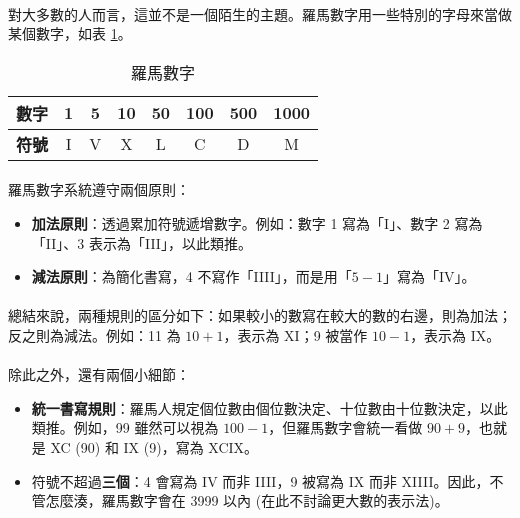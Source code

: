 \documentclass[12pt,a4paper,oneside]{article}
\begin{document}
\begin{CJK}{UTF8}{bkai}
\paragraph{}對大多數的人而言，這並不是一個陌生的主題。羅馬數字用一些特別的字母來當做某個數字，如表 \ref{string:mani:table:roman:number}。

\begin{table}[h!]
  \centering
  \begin{tabular}{|c||c|c|c|c|c|c|c|}
  \hline
  \textbf{數字} & 1 & 5 & 10 & 50 & 100 & 500 & 1000\\
  \hline
  \textbf{符號} & I & V & X & L & C & D & M\\
  \hline
  \end{tabular}
  \caption{羅馬數字}
  \label{string:mani:table:roman:number}
\end{table}

\paragraph{}羅馬數字系統遵守兩個原則：

\begin{itemize}
\item \textbf{加法原則}：透過累加符號遞增數字。例如：數字 1 寫為「I」、數字 2 寫為「II」、3 表示為「III」，以此類推。
\item \textbf{減法原則}：為簡化書寫，4 不寫作「IIII」，而是用「$5-1$」寫為「IV」。
\end{itemize}

\paragraph{}總結來說，兩種規則的區分如下：如果較小的數寫在較大的數的右邊，則為加法；反之則為減法。例如：11 為 $10+1$，表示為 XI；9 被當作 $10-1$，表示為 IX。
\paragraph{}除此之外，還有兩個小細節：

\begin{itemize}
\item \textbf{統一書寫規則}：羅馬人規定個位數由個位數決定、十位數由十位數決定，以此類推。例如，99 雖然可以視為 $100-1$，但羅馬數字會統一看做 $90+9$，也就是 XC (90) 和 IX (9)，寫為 XCIX。
\item 符號不超過\textbf{三個}：4 會寫為 IV 而非 IIII，9 被寫為 IX 而非 XIIII。因此，不管怎麼湊，羅馬數字會在 3999 以內 (在此不討論更大數的表示法)。
\end{itemize}


\end{CJK}
\end{document}

